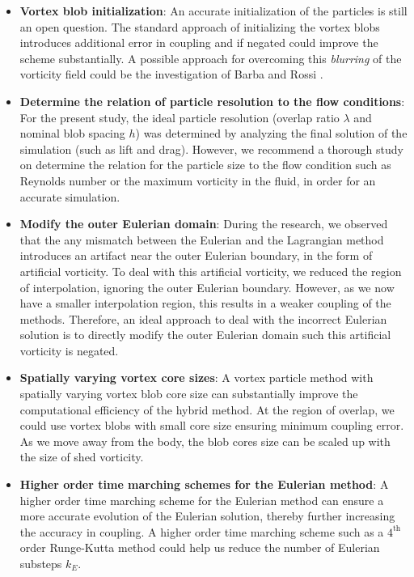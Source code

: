\begin{itemize}

\item \textbf{Vortex blob initialization}: An accurate initialization of the particles is still an open question. The standard approach of initializing the vortex blobs introduces additional error in coupling and if negated could improve the scheme substantially. A possible approach for overcoming this \textit{blurring} of the vorticity field could be the investigation of Barba and Rossi \cite{Barba2010a}.

\item \textbf{Determine the relation of particle resolution to the flow conditions}: For the present study, the ideal particle resolution (overlap ratio $\lambda$ and nominal blob spacing $h$) was determined by analyzing the final solution of the simulation (such as lift and drag). However, we recommend a thorough study on determine the relation for the particle size to the flow condition such as Reynolds number or the maximum vorticity in the fluid, in order for an accurate simulation.

\item \textbf{Modify the outer Eulerian domain}: During the research, we observed that the any mismatch between the Eulerian and the Lagrangian method introduces an artifact near the outer Eulerian boundary, in the form of artificial vorticity. To deal with this artificial vorticity, we reduced the region of interpolation, ignoring the outer Eulerian boundary. However, as we now have a smaller interpolation region, this results in a weaker coupling of the methods. Therefore, an ideal approach to deal with the incorrect Eulerian solution is to directly modify the outer Eulerian domain such this artificial vorticity is negated.

\item \textbf{Spatially varying vortex core sizes}: A vortex particle method with spatially varying vortex blob core size can substantially improve the computational efficiency of the hybrid method. At the region of overlap, we could use vortex blobs with small core size ensuring minimum coupling error. As we move away from the body, the blob cores size can be scaled up with the size of shed vorticity.

\item \textbf{Higher order time marching schemes for the Eulerian method}: A higher order time marching scheme for the Eulerian method can ensure a more accurate evolution of the Eulerian solution, thereby further increasing the accuracy in coupling. A higher order time marching scheme such as a $4^{\mathrm{th}}$ order Runge-Kutta method could help us reduce the number of Eulerian substeps $k_E$.


\end{itemize}
